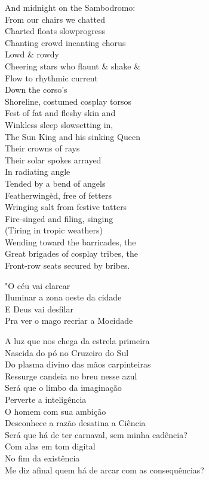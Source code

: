 And midnight on the Sambodromo: \\
From our chairs we chatted \\
Charted floats slowprogress \\
Chanting crowd incanting chorus \\
Lowd \& rowdy \\
Cheering stars who flaunt \& shake \& \\
Flow to rhythmic current \\
Down the corso's \\
Shoreline, costumed cosplay torsos \\
Fest of fat and fleshy skin and \\
Winkless sleep slowsetting in, \\
The Sun King and his sinking Queen \\
Their crowns of rays \\
Their solar spokes arrayed \\
In radiating angle \\
Tended by a bend of angels \\
Featherwingèd, free of fetters \\
Wringing salt from festive tatters \\
Fire-singed and filing, singing \\
(Tiring in tropic weathers) \\
Wending toward the barricades, the \\
Great brigades of cosplay tribes, the \\
Front-row seats secured by bribes.

"O céu vai clarear \\
Iluminar a zona oeste da cidade \\
E Deus vai desfilar \\
Pra ver o mago recriar a Mocidade 

A luz que nos chega da estrela primeira \\
Nascida do pó no Cruzeiro do Sul \\
Do plasma divino das mãos carpinteiras \\
Ressurge candeia no breu nesse azul \\
Será que o limbo da imaginação \\
Perverte a inteligência \\
O homem com sua ambição \\
Desconhece a razão desatina a Ciência \\
Será que há de ter carnaval, sem minha cadência? \\
Com alas em tom digital \\
No fim da existência \\
Me diz afinal quem há de arcar com as consequências?

